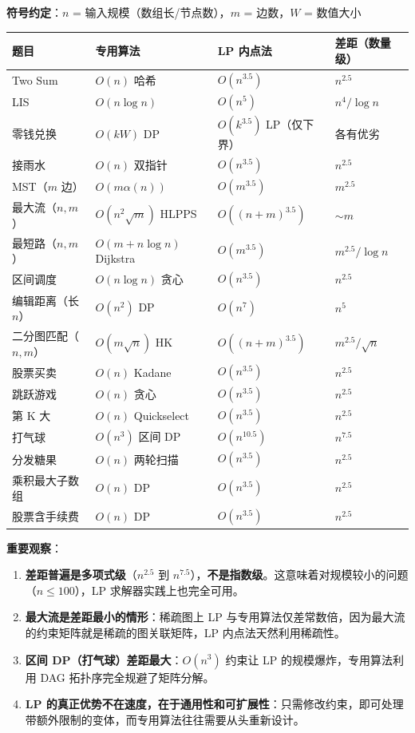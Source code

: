 \documentclass[12pt, a4paper]{ctexart}
\begin{document}
\begin{blackboard}

\textbf{符号约定}：$n$ = 输入规模（数组长/节点数），$m$ = 边数，$W$ = 数值大小

\begin{center}
\begin{tabular}{llll}
\toprule
题目 & 专用算法 & LP 内点法 & 差距（数量级）\\
\midrule
Two Sum & $O(n)$ 哈希 & $O(n^{3.5})$ & $n^{2.5}$ \\
LIS & $O(n\log n)$ & $O(n^{5})$ & $n^4/\log n$ \\
零钱兑换 & $O(kW)$ DP & $O(k^{3.5})$ LP（仅下界）& 各有优劣 \\
接雨水 & $O(n)$ 双指针 & $O(n^{3.5})$ & $n^{2.5}$ \\
MST（$m$ 边） & $O(m\alpha(n))$ & $O(m^{3.5})$ & $m^{2.5}$ \\
最大流（$n,m$） & $O(n^2\sqrt{m})$ HLPPS & $O((n+m)^{3.5})$ & $\sim m$ \\
最短路（$n,m$） & $O(m+n\log n)$ Dijkstra & $O(m^{3.5})$ & $m^{2.5}/\log n$ \\
区间调度 & $O(n\log n)$ 贪心 & $O(n^{3.5})$ & $n^{2.5}$ \\
编辑距离（长 $n$） & $O(n^2)$ DP & $O(n^7)$ & $n^5$ \\
二分图匹配（$n,m$）& $O(m\sqrt{n})$ HK & $O((n+m)^{3.5})$ & $m^{2.5}/\sqrt{n}$ \\
股票买卖 & $O(n)$ Kadane & $O(n^{3.5})$ & $n^{2.5}$ \\
跳跃游戏 & $O(n)$ 贪心 & $O(n^{3.5})$ & $n^{2.5}$ \\
第 K 大 & $O(n)$ Quickselect & $O(n^{3.5})$ & $n^{2.5}$ \\
打气球 & $O(n^3)$ 区间 DP & $O(n^{10.5})$ & $n^{7.5}$ \\
分发糖果 & $O(n)$ 两轮扫描 & $O(n^{3.5})$ & $n^{2.5}$ \\
乘积最大子数组 & $O(n)$ DP & $O(n^{3.5})$ & $n^{2.5}$ \\
股票含手续费 & $O(n)$ DP & $O(n^{3.5})$ & $n^{2.5}$ \\
\bottomrule
\end{tabular}
\end{center}

\textbf{重要观察}：

\begin{enumerate}
    \item \textbf{差距普遍是多项式级}（$n^{2.5}$ 到 $n^{7.5}$），\textbf{不是指数级}。这意味着对规模较小的问题（$n \leq 100$），LP 求解器实践上也完全可用。
    \item \textbf{最大流是差距最小的情形}：稀疏图上 LP 与专用算法仅差常数倍，因为最大流的约束矩阵就是稀疏的图关联矩阵，LP 内点法天然利用稀疏性。
    \item \textbf{区间 DP（打气球）差距最大}：$O(n^3)$ 约束让 LP 的规模爆炸，专用算法利用 DAG 拓扑序完全规避了矩阵分解。
    \item \textbf{LP 的真正优势不在速度，在于通用性和可扩展性}：只需修改约束，即可处理带额外限制的变体，而专用算法往往需要从头重新设计。
\end{enumerate}

\end{blackboard}
\end{document}

